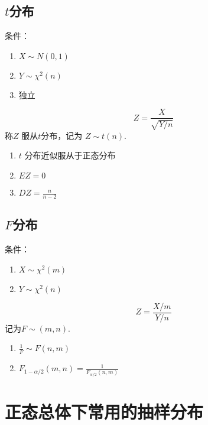 \subsection{$t$分布}
\label{sub:_t_分布}

\begin{definition}
    条件：
    \begin{enumerate}
        \item $X \sim N(0,1)$
        \item $Y \sim \chi^2(n)$
        \item 独立
    \end{enumerate}
    \[
        Z = \frac{X}{\sqrt{Y/n}}
    \]
    称$Z$ 服从$t$分布，记为 $Z \sim t(n).$
\end{definition}

\begin{theorem}
    \begin{enumerate}
        \item $t$ 分布近似服从于正态分布
        \item $EZ = 0$
        \item $DZ = \frac{n}{n-2}$
    \end{enumerate}
\end{theorem}

\subsection{$F$分布}
\label{sub:_f_分布}

\begin{definition}
    条件：
    \begin{enumerate}
        \item $X \sim \chi^2(m)$
        \item $Y \sim \chi^2(n)$
    \end{enumerate}
    \[
        Z = \frac{X/m}{Y/n}
    \]
    记为$F \sim (m,n).$
\end{definition}

\begin{theorem}
    \begin{enumerate}
        \item $\frac{1}{F} \sim F(n,m)$
        \item $F_{1-\alpha/2}(m,n)= \frac{1}{F_{\alpha/2}(n,m)}$
    \end{enumerate}
\end{theorem}

\section{正态总体下常用的抽样分布}
\label{sec:正态总体下常用的抽样分布}

